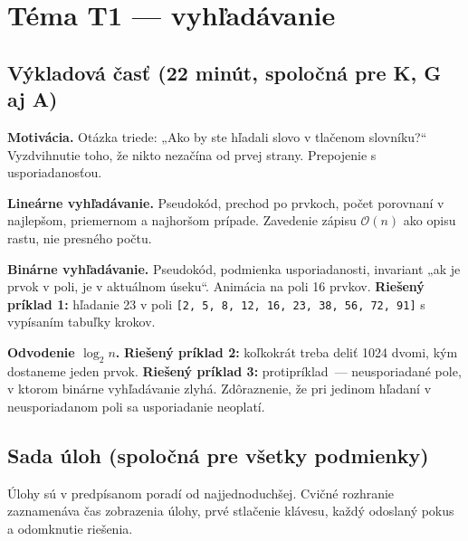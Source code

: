 \section{Téma T1 --- vyhľadávanie}

\subsection{Výkladová časť (22 minút, spoločná pre K, G aj A)}

\begin{description}[leftmargin=1.5cm, style=nextline, nosep]
    \item[5--10 min] \textbf{Motivácia.} Otázka triede: „Ako by ste hľadali slovo v tlačenom slovníku?“ Vyzdvihnutie toho, že nikto nezačína od prvej strany. Prepojenie s usporiadanosťou.
    \item[10--18 min] \textbf{Lineárne vyhľadávanie.} Pseudokód, prechod po prvkoch, počet porovnaní v najlepšom, priemernom a najhoršom prípade. Zavedenie zápisu $\mathcal{O}(n)$ ako opisu rastu, nie presného počtu.
    \item[18--30 min] \textbf{Binárne vyhľadávanie.} Pseudokód, podmienka usporiadanosti, invariant „ak je prvok v poli, je v aktuálnom úseku“. Animácia na poli 16 prvkov. \textbf{Riešený príklad 1:} hľadanie 23 v poli \texttt{[2, 5, 8, 12, 16, 23, 38, 56, 72, 91]} s vypísaním tabuľky krokov.
    \item[30--35 min] \textbf{Odvodenie $\log_2 n$.} \textbf{Riešený príklad 2:} koľkokrát treba deliť 1024 dvomi, kým dostaneme jeden prvok. \textbf{Riešený príklad 3:} protipríklad~--- neusporiadané pole, v ktorom binárne vyhľadávanie zlyhá. Zdôraznenie, že pri jedinom hľadaní v neusporiadanom poli sa usporiadanie neoplatí.
\end{description}

\subsection{Sada úloh (spoločná pre všetky podmienky)}

Úlohy sú v predpísanom poradí od najjednoduchšej. Cvičné rozhranie zaznamenáva čas zobrazenia úlohy, prvé stlačenie klávesu, každý odoslaný pokus a odomknutie riešenia.

